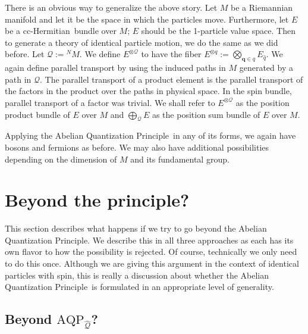 \documentclass[11pt]{article}
\theoremstyle{remark}
\begin{document}
There is an obvious way to generalize the above story. Let $M$ be a
Riemannian manifold and let it be the space in which the particles
move. Furthermore, let $E$ be a cc-Hermitian\ bundle over  $M$; $E$ should be 
the 1-particle value space. Then to generate a theory of identical
particle motion, we do the same as we did before. Let $\ensuremath{\mathcal{Q}} :=
\ensuremath{{}^{N}\! {M}}$.  We define $E^{\otimes \ensuremath{\mathcal{Q}}}$ to have the fiber
$E^{\otimes \ensuremath{q}} \ensuremath{:=} \bigotimes_{\ensuremath{\boldsymbol{q}} \in \ensuremath{q}} E_{\ensuremath{\hat{q}}}$. 
We again define parallel
transport by using the induced paths in $M$ generated by a path in
\ensuremath{\mathcal{Q}}.  The parallel transport of a product element is the  
parallel transport of  the factors in the product  over
the  paths in physical space. In the spin bundle, 
parallel
transport of a factor was trivial.
 We shall refer to
$E^{\otimes \ensuremath{\mathcal{Q}}}$ as the position product bundle of $E$ over $M$
and $\bigoplus_{\ensuremath{\mathcal{Q}}} E$ as the position sum bundle of $E$ over $M$.

Applying the Abelian Quantization Principle\ in any of its forms, 
we again have bosons and fermions as before. We may
also have additional possibilities depending on the dimension of $M$
and its fundamental group. 
 

\section{Beyond the principle?} 

This section describes what happens if we try to go beyond the Abelian Quantization Principle. We
describe this in all three approaches as each has its own flavor to
how the possibility is rejected. Of course, technically we only need
to do this once. Although we are giving this argument in the context
of identical particles with spin, this is really a discussion about
whether the Abelian Quantization Principle\ is formulated in an appropriate level of generality.

\subsection{Beyond \ensuremath{\text{AQP}_{\ensuremath{\widehat{\ensuremath{\mathcal{Q}}}}}}?} \label{s:bprin}
\end{document}
